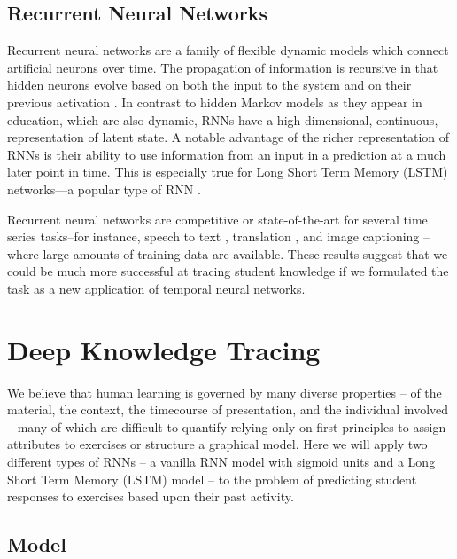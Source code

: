 \documentclass{article} \usepackage{nips,times}
\begin{document}
\subsection{Recurrent Neural Networks}

Recurrent neural networks are a family of flexible dynamic models which connect artificial neurons over time. The propagation of information is recursive in that hidden neurons evolve based on both the input to the system and on their previous activation \cite{williams1989learning}. 
In contrast to hidden Markov models as they appear in education, which are also dynamic, RNNs have a high dimensional, continuous, representation of latent state. A notable advantage of the richer representation of RNNs is their ability to use information from an input in a prediction at a much later point in time. This is especially true for Long Short Term Memory (LSTM) networks---a popular type of RNN \cite{hochreiter1997long}.

Recurrent neural networks 
are competitive or state-of-the-art for several 
time series tasks--for instance, speech to text \cite{graves2013speech}, translation \cite{mikolov2010recurrent}, and image captioning \cite{karpathy2014deep}--where large amounts of training data are available. These results suggest that we could be much more successful at tracing student knowledge if we formulated the task as a new application of temporal neural networks.


\section{Deep Knowledge Tracing}

We believe that human learning is governed by many diverse properties -- of the material, the context, the timecourse of presentation, and the individual involved -- many of which are difficult to quantify relying only on first principles to assign attributes to exercises or structure a graphical model. Here we will apply two different types of RNNs -- a vanilla RNN model with sigmoid units and a Long Short Term Memory (LSTM) model -- to the problem of predicting student responses to exercises based upon their past activity.









\subsection{Model}
\end{document}
